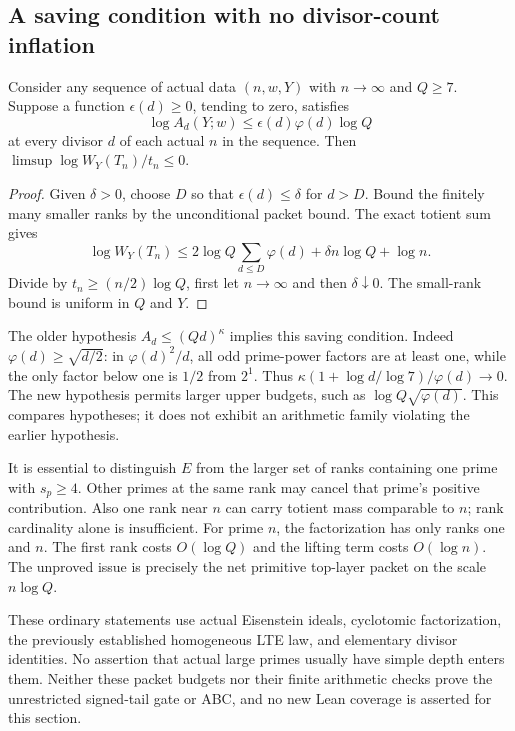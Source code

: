 \subsection{A saving condition with no divisor-count inflation}
\begin{theorem}\label{cp-saving}
Consider any sequence of actual data $(n,w,Y)$ with $n\to\infty$ and
$Q\ge7$. Suppose a function $\epsilon(d)\ge0$, tending to zero,
satisfies
\[
 \log A_d(Y;w)\le\epsilon(d)\varphi(d)\log Q
\]
at every divisor $d$ of each actual $n$ in the sequence. Then
$\limsup\log W_Y(T_n)/t_n\le0$.
\end{theorem}
\begin{proof}
Given $\delta>0$, choose $D$ so that $\epsilon(d)\le\delta$ for
$d>D$. Bound the finitely many smaller ranks by the unconditional
packet bound. The exact totient sum gives
\[
 \log W_Y(T_n)\le2\log Q\sum_{d\le D}\varphi(d)
                     +\delta n\log Q+\log n.
\]
Divide by $t_n\ge(n/2)\log Q$, first let $n\to\infty$ and then
$\delta\downarrow0$. The small-rank bound is uniform in $Q$ and $Y$.
\end{proof}
The older hypothesis $A_d\le(Qd)^\kappa$ implies this saving condition.
Indeed $\varphi(d)\ge\sqrt{d/2}$: in $\varphi(d)^2/d$, all odd
prime-power factors are at least one, while the only factor below one
is $1/2$ from $2^1$. Thus
$\kappa(1+\log d/\log7)/\varphi(d)\to0$.
The new hypothesis permits larger upper budgets, such as
$\log Q\sqrt{\varphi(d)}$. This compares hypotheses; it does not
exhibit an arithmetic family violating the earlier hypothesis.

It is essential to distinguish $E$ from the larger set of ranks
containing one prime with $s_p\ge4$. Other primes at the same rank
may cancel that prime's positive contribution. Also one rank near
$n$ can carry totient mass comparable to $n$; rank cardinality alone
is insufficient. For prime $n$, the factorization has only ranks one
and $n$. The first rank costs $O(\log Q)$ and the lifting term costs
$O(\log n)$. The unproved issue is precisely the net primitive
top-layer packet on the scale $n\log Q$.

These ordinary statements use actual Eisenstein ideals, cyclotomic
factorization, the previously established homogeneous LTE law, and
elementary divisor identities. No assertion that actual large primes
usually have simple depth enters them. Neither these packet budgets
nor their finite arithmetic checks prove the unrestricted signed-tail
gate or ABC, and no new Lean coverage is asserted for this section.
